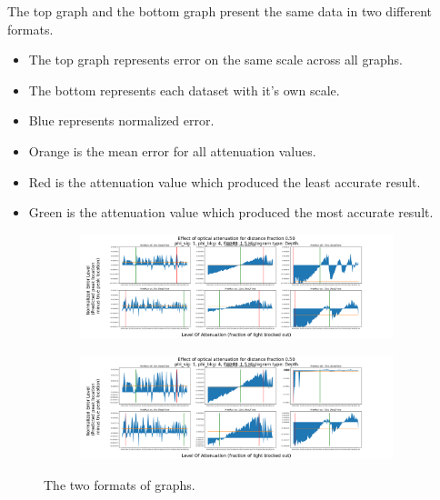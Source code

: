 \documentclass[aspectratio=169]{beamer}
\begin{document}
\begin{frame}
  The top graph and the bottom graph present the same data in two different formats.
  \begin{itemize}
    \color{Blue}
  \item The top graph represents error on the same scale across all graphs.
  \item The bottom represents each dataset with it's own scale.
  \item Blue represents normalized error.
  \item Orange is the mean error for all attenuation values.
  \item Red is the attenuation value which produced the least accurate result.
  \item Green is the attenuation value which produced the most accurate result.
  \end{itemize}
\end{frame}

\begin{frame}
  \begin{figure}[H]
    \centering
    \begin{subfigure}[b]{0.75\textwidth}
      \includegraphics[width=1\linewidth]{SharedyExample.png}
      \label{fig:Ng1}
    \end{subfigure}
    \begin{subfigure}[b]{0.75\textwidth}
      \includegraphics[width=1\linewidth]{ZoomedyExample.png}
      \label{fig:Ng2}
    \end{subfigure}
    \caption{\label{fig:Data}\color{Blue}The two formats of graphs.}
  \end{figure}
\end{frame}
\end{document}
